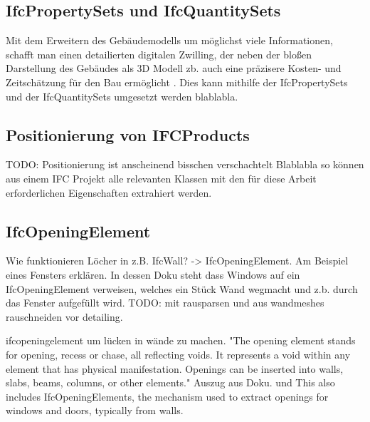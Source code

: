 \subsection{IfcPropertySets und IfcQuantitySets}\label{basics:ifc_properties}
Mit dem Erweitern des Gebäudemodells um möglichst viele Informationen, schafft man einen detailierten digitalen Zwilling, der neben der bloßen Darstellung des Gebäudes als 3D Modell zb. auch eine präzisere Kosten- und Zeitschätzung für den Bau ermöglicht \cite{Industry93:online}. 
Dies kann mithilfe der IfcPropertySets und der IfcQuantitySets umgesetzt werden blablabla. %

\subsection{Positionierung von IFCProducts}
TODO: Positionierung ist anscheinend bisschen verschachtelt
Blablabla so können aus einem IFC Projekt alle relevanten Klassen mit den für diese Arbeit erforderlichen Eigenschaften extrahiert werden.


\subsection{IfcOpeningElement}
\label{basics:IfcOpeningElement}
Wie funktionieren Löcher in z.B. IfcWall? -> IfcOpeningElement.
Am Beispiel eines Fensters erklären. In dessen Doku steht dass Windows auf ein IfcOpeningElement verweisen, welches ein Stück Wand wegmacht und z.b. durch das Fenster aufgefüllt wird.
TODO: mit rausparsen und aus wandmeshes rauschneiden vor detailing.

ifcopeningelement um lücken in wände zu machen.
"The opening element stands for opening, recess or chase, all reflecting voids. It represents a void within any element that has physical manifestation. Openings can be inserted into walls, slabs, beams, columns, or other elements." Auszug aus Doku. und This also includes IfcOpeningElements, the mechanism used to extract openings for windows and doors, typically from walls. %

